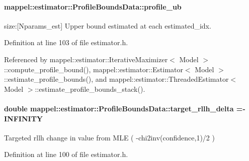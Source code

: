 \paragraph[{\texorpdfstring{profile\+\_\+ub}{profile_ub}}]{ mappel\+::estimator\+::\+Profile\+Bounds\+Data\+::profile\+\_\+ub}\hypertarget{structmappel_1_1estimator_1_1ProfileBoundsData_a8c7233892f731a927d21ec086eaca33f}{}\label{structmappel_1_1estimator_1_1ProfileBoundsData_a8c7233892f731a927d21ec086eaca33f}


size\+:\mbox{[}Nparams\+\_\+est\mbox{]} Upper bound estimated at each estimated\+\_\+idx. 



Definition at line 103 of file estimator.\+h.



Referenced by mappel\+::estimator\+::\+Iterative\+Maximizer$<$ Model $>$\+::compute\+\_\+profile\+\_\+bound(), mappel\+::estimator\+::\+Estimator$<$ Model $>$\+::estimate\+\_\+profile\+\_\+bounds(), and mappel\+::estimator\+::\+Threaded\+Estimator$<$ Model $>$\+::estimate\+\_\+profile\+\_\+bounds\+\_\+stack().

\paragraph[{\texorpdfstring{target\+\_\+rllh\+\_\+delta}{target_rllh_delta}}]{\setlength{\rightskip}{0pt plus 5cm}double mappel\+::estimator\+::\+Profile\+Bounds\+Data\+::target\+\_\+rllh\+\_\+delta =-\/I\+N\+F\+I\+N\+I\+TY}\hypertarget{structmappel_1_1estimator_1_1ProfileBoundsData_a524173c1125ec843b904feb119fb182b}{}\label{structmappel_1_1estimator_1_1ProfileBoundsData_a524173c1125ec843b904feb119fb182b}


Targeted rllh change in value from M\+LE ( -\/chi2inv(confidence,1)/2 ) 



Definition at line 100 of file estimator.\+h.



